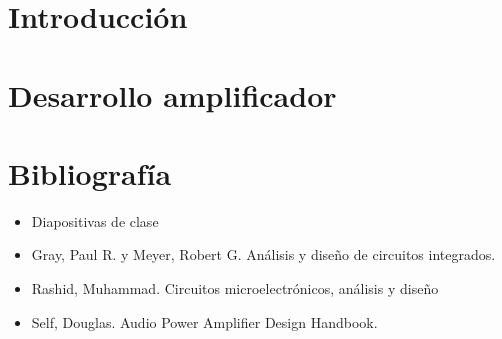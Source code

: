 \documentclass[10pt,a4paper]{article}
\begin{document}


\newpage


\tableofcontents

\section{Introducción}



\section{Desarrollo amplificador}



\section{Bibliografía}

\vspace{0.4cm}

\begin{itemize}
    \item Diapositivas de clase
    \item Gray, Paul R. y Meyer, Robert G. Análisis y diseño de circuitos integrados.
    \item Rashid, Muhammad. Circuitos microelectrónicos, análisis y diseño
    \item Self, Douglas. Audio Power Amplifier Design Handbook.
    
\end{itemize}
\end{document}
